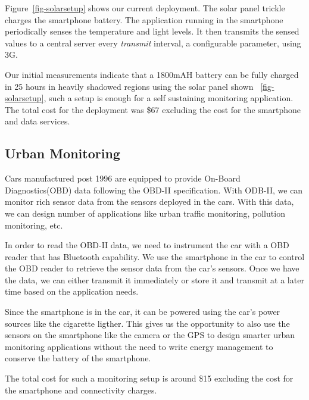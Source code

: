 Figure~\ref{fig-solarsetup} shows our current deployment. The solar panel trickle
charges the smartphone battery. The application running in the smartphone
periodically senses the temperature and light levels. It then transmits the
sensed values to a central server every \textit{transmit} interval, a
configurable parameter, using 3G. 

Our initial measurements indicate that a 1800mAH battery can be fully charged
in 25
hours in heavily shadowed regions using the solar panel shown 
~\ref{fig-solarsetup}, such a setup is
enough for a self sustaining monitoring application. The total cost for the
deployment was \$67 excluding the cost for the smartphone and data services.

\subsection{Urban Monitoring}
Cars manufactured post 1996 are equipped to provide On-Board Diagnostics(OBD)
data following the OBD-II specification. With ODB-II, we can monitor rich
sensor data from the sensors deployed in the cars. With this data, we can design number of
applications like urban traffic monitoring, pollution monitoring, etc. 

In order to read the OBD-II data, we need to instrument the car
with a OBD reader that has Bluetooth capability. We use the smartphone in the car to control
the OBD reader to retrieve the sensor data from the car's sensors. Once we have
the data, we can either transmit it immediately or store it and transmit at a
later time based on the application needs.

Since the smartphone is in the car, it can be powered using the car's power
sources like the cigarette ligther. This gives us the opportunity to also use the sensors on the
smartphone like the camera or the GPS to design smarter urban monitoring
applications without the need to write  energy management to conserve the
battery of the smartphone.

The total cost for such a monitoring setup is around \$15 excluding the cost
for the smartphone and connectivity charges.

